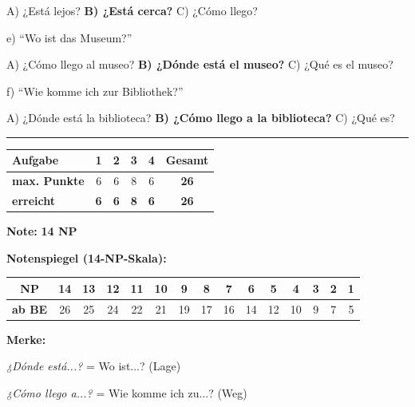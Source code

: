 \documentclass[11pt, a4paper]{article}
\newcommand{\lsg}[1]{\textcolor{loesung}{\textbf{#1}}}
\begin{document}
\hspace{1cm} A) ¿Está lejos? \quad \lsg{B) ¿Está cerca?} \quad C) ¿Cómo llego?

\vspace{0.8em}

\noindent
e) ``Wo ist das Museum?''

\hspace{1cm} A) ¿Cómo llego al museo? \quad \lsg{B) ¿Dónde está el museo?} \quad C) ¿Qué es el museo?

\vspace{0.8em}

\noindent
f) ``Wie komme ich zur Bibliothek?''

\hspace{1cm} A) ¿Dónde está la biblioteca? \quad \lsg{B) ¿Cómo llego a la biblioteca?} \quad C) ¿Qué es?


\vspace{25pt}
\hrule
\vspace{10pt}

\noindent
\begin{tabularx}{\textwidth}{|X|c|c|c|c||c|}
\hline
\textbf{Aufgabe} & 1 & 2 & 3 & 4 & \textbf{Gesamt} \\
\hline
\textbf{max. Punkte} & 6 & 6 & 8 & 6 & \textbf{26} \\
\hline
\textbf{erreicht} & \lsg{6} & \lsg{6} & \lsg{8} & \lsg{6} & \lsg{26} \\
\hline
\end{tabularx}

\vspace{10pt}

\begin{flushright}
\textbf{Note:} \lsg{14 NP}
\end{flushright}

\vspace{1em}

\textbf{Notenspiegel (14-NP-Skala):}

\begin{center}
\footnotesize
\begin{tabular}{|c|c|c|c|c|c|c|c|c|c|c|c|c|c|c|}
\hline
\textbf{NP} & 14 & 13 & 12 & 11 & 10 & 9 & 8 & 7 & 6 & 5 & 4 & 3 & 2 & 1 \\
\hline
\textbf{ab BE} & 26 & 25 & 24 & 22 & 21 & 19 & 17 & 16 & 14 & 12 & 10 & 9 & 7 & 5 \\
\hline
\end{tabular}
\end{center}

\vspace{1em}

\textcolor{loesung}{\textbf{Merke:}}

\textcolor{loesung}{\textit{¿Dónde está...?} = Wo ist...? (Lage)}

\textcolor{loesung}{\textit{¿Cómo llego a...?} = Wie komme ich zu...? (Weg)}
\end{document}
